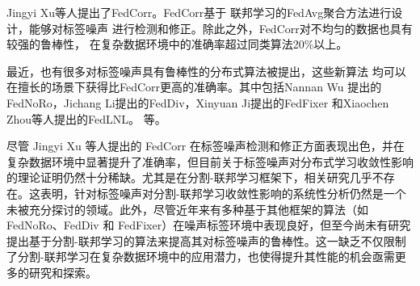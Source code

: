 Jingyi Xu等人提出了FedCorr\cite{xu2022fedcorr}。FedCorr基于
联邦学习的FedAvg聚合方法进行设计，能够对标签噪声
进行检测和修正。除此之外，FedCorr对不均匀的数据也具有较强的鲁棒性，
在复杂数据环境中的准确率超过同类算法20\%以上。

最近，也有很多对标签噪声具有鲁棒性的分布式算法被提出，这些新算法
均可以在擅长的场景下获得比FedCorr更高的准确率。其中包括Nannan Wu
提出的FedNoRo\cite{wu2023fednoro}，Jichang Li提出的FedDiv\cite{li2024feddiv}，Xinyuan Ji提出的FedFixer
\cite{ji2024fedfixer}
和Xiaochen Zhou等人提出的FedLNL\cite{zhou2024federated}。
等。 

尽管 Jingyi Xu 等人提出的 FedCorr 在标签噪声检测和修正方面表现出色，并在复杂数据环境中显著提升了准确率，但目前关于标签噪声对分布式学习收敛性影响的理论证明仍然十分稀缺。尤其是在分割-联邦学习框架下，相关研究几乎不存在。这表明，针对标签噪声对分割-联邦学习收敛性影响的系统性分析仍然是一个未被充分探讨的领域。此外，尽管近年来有多种基于其他框架的算法（如 FedNoRo、FedDiv 和 FedFixer）在噪声标签环境中表现良好，但至今尚未有研究提出基于分割-联邦学习的算法来提高其对标签噪声的鲁棒性。这一缺乏不仅限制了分割-联邦学习在复杂数据环境中的应用潜力，也使得提升其性能的机会亟需更多的研究和探索。




